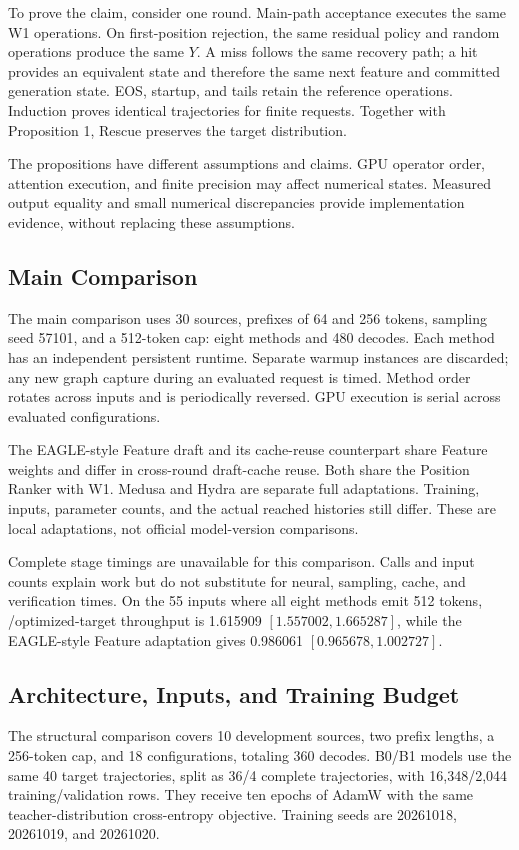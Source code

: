 To prove the claim, consider one round. Main-path acceptance executes the same W1 operations. On first-position rejection, the same residual policy and random operations produce the same $Y$. A miss follows the same recovery path; a hit provides an equivalent state and therefore the same next feature and committed generation state. EOS, startup, and tails retain the reference operations. Induction proves identical trajectories for finite requests. Together with Proposition 1, Rescue preserves the target distribution.

The propositions have different assumptions and claims. GPU operator order, attention execution, and finite precision may affect numerical states. Measured output equality and small numerical discrepancies provide implementation evidence, without replacing these assumptions.

\subsection{Main Comparison}
\label{app:main}
The main comparison uses 30 sources, prefixes of 64 and 256 tokens, sampling seed 57101, and a 512-token cap: eight methods and 480 decodes. Each method has an independent persistent runtime. Separate warmup instances are discarded; any new graph capture during an evaluated request is timed. Method order rotates across inputs and is periodically reversed. GPU execution is serial across evaluated configurations.

The EAGLE-style Feature draft and its cache-reuse counterpart share Feature weights and differ in cross-round draft-cache reuse. Both share the Position Ranker with W1. Medusa and Hydra are separate full adaptations. Training, inputs, parameter counts, and the actual reached histories still differ. These are local adaptations, not official model-version comparisons.

Complete stage timings are unavailable for this comparison. Calls and input counts explain work but do not substitute for neural, sampling, cache, and verification times. On the 55 inputs where all eight methods emit 512 tokens, \PF/optimized-target throughput is 1.615909 $[1.557002,1.665287]$, while the EAGLE-style Feature adaptation gives 0.986061 $[0.965678,1.002727]$.

\subsection{Architecture, Inputs, and Training Budget}
\label{app:structure}
The structural comparison covers 10 development sources, two prefix lengths, a 256-token cap, and 18 configurations, totaling 360 decodes. B0/B1 models use the same 40 target trajectories, split as 36/4 complete trajectories, with 16,348/2,044 training/validation rows. They receive ten epochs of AdamW with the same teacher-distribution cross-entropy objective. Training seeds are 20261018, 20261019, and 20261020.

